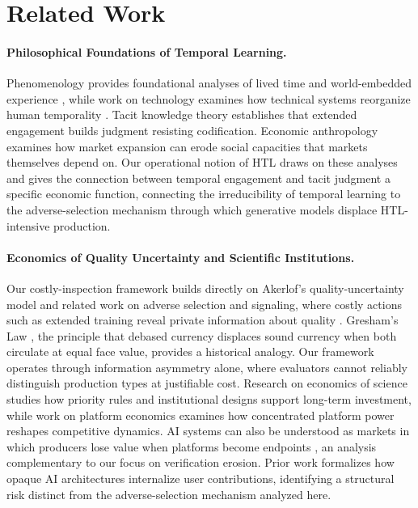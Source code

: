 \documentclass{article}
\theoremstyle{plain}
\theoremstyle{definition}
\theoremstyle{remark}
\begin{document}
\section{Related Work}
\label{sec:related}

\paragraph{Philosophical Foundations of Temporal Learning.}
Phenomenology provides foundational analyses of lived time and world-embedded experience \citep{Husserl1954-HUSKDW, Heidegger1927-HEISUZ}, while work on technology examines how technical systems reorganize human temporality \citep{Heidegger1954-HEIVUA, Wiener1950-WIETHU}. Tacit knowledge theory \citep{Polanyi1966-POLTTD} establishes that extended engagement builds judgment resisting codification. Economic anthropology \citep{polanyi1944greattransformation} examines how market expansion can erode social capacities that markets themselves depend on. Our operational notion of HTL draws on these analyses and gives the connection between temporal engagement and tacit judgment a specific economic function, connecting the irreducibility of temporal learning to the adverse-selection mechanism through which generative models displace HTL-intensive production.

\paragraph{Economics of Quality Uncertainty and Scientific Institutions.}
Our costly-inspection framework builds directly on Akerlof's quality-uncertainty model \citep{akerlof1970lemons} and related work on adverse selection \citep{rothschild-stiglitz-1976-equilibrium} and signaling, where costly actions such as extended training reveal private information about quality \citep{spence1973signaling}. Gresham's Law \citep{mundell1998uses, rolnick1986gresham}, the principle that debased currency displaces sound currency when both circulate at equal face value, provides a historical analogy. Our framework operates through information asymmetry alone, where evaluators cannot reliably distinguish production types at justifiable cost. Research on economics of science \citep{PARTHA1994487} studies how priority rules and institutional designs support long-term investment, while work on platform economics \citep{vipra2023marketconcentrationimplicationsfoundation} examines how concentrated platform power reshapes competitive dynamics. AI systems can also be understood as markets in which producers lose value when platforms become endpoints \citep{jordan2025collectivisteconomicperspectiveai}, an analysis complementary to our focus on verification erosion. Prior work \citep{cao2025blackboxabsorptionllms} formalizes how opaque AI architectures internalize user contributions, identifying a structural risk distinct from the adverse-selection mechanism analyzed here.
\end{document}
